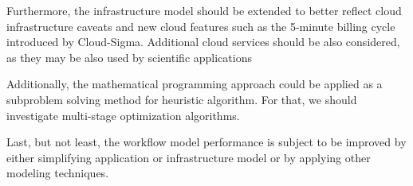 Furthermore, the infrastructure model should be extended to better reflect cloud infrastructure caveats and new cloud features such as the 5-minute billing cycle introduced by Cloud-Sigma. Additional cloud services should be also considered, as they may be also used by scientific applications

Additionally, the mathematical programming approach could be applied as a subproblem solving method for heuristic algorithm. For that, we should investigate multi-stage optimization algorithms.

Last, but not least, the workflow model performance is subject to be improved by either simplifying application or infrastructure model or by applying other modeling techniques.



